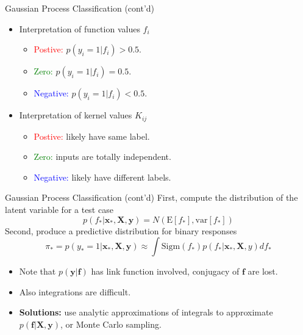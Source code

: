 \documentclass[10pt,mathserif]{beamer}
\begin{document}
\begin{frame}{Gaussian Process Classification (cont'd)}
\begin{itemize}
    \item Interpretation of function values $f_i$
    \begin{itemize}
        \item \textcolor{red}{Postive:} $p(y_i = 1 |f_i) > 0.5$.
        \item \textcolor{green}{Zero:} $p(y_i = 1 |f_i) = 0.5$.
        \item \textcolor{blue}{Negative:} $p(y_i = 1 |f_i) < 0.5$.
    \end{itemize}
    \item Interpretation of kernel values $K_{ij}$
    \begin{itemize}
        \item \textcolor{red}{Postive:} likely have same label.
        \item \textcolor{green}{Zero:} inputs are totally independent.
        \item \textcolor{blue}{Negative:} likely have different labels.
    \end{itemize}
\end{itemize}    
\end{frame}

\begin{frame}{Gaussian Process Classification (cont'd)}
First, compute the distribution of the latent variable for a test case
\begin{equation*}
    p(f_*|\bm{x}_*, \bm{X}, \bm{y}) = N (\text{E}[f_*] , \text{var}[f_*]) 
\end{equation*}
Second, produce a predictive distribution for binary responses
\begin{equation*}
    \pi_* = p(y_* = 1|\bm{x}_*, \bm{X}, \bm{y}) \approx \int \text{Sigm}(f_*)p(f_*|\bm{x}_*, \bm{X}, y)df_*
\end{equation*}
\begin{itemize}
    \item Note that $p(\bm{y}|\bm{f})$ has link function involved, conjugacy of $\bm{f}$ are lost.
    \item Also integrations are difficult.
    \item \textbf{Solutions:} use analytic approximations of integrals to approximate $p(\bm{f}|\bm{X}, \bm{y})$, or Monte Carlo sampling.
\end{itemize}    
\end{frame}
\end{document}
